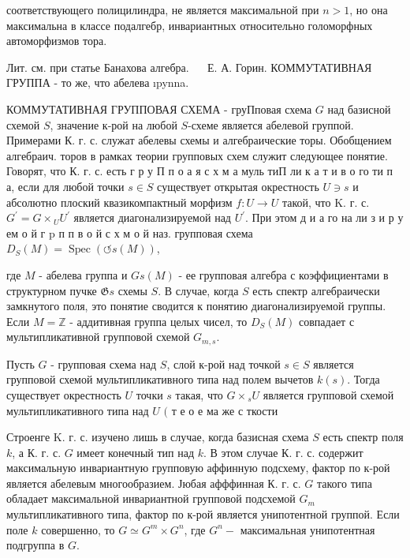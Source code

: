 \documentclass[10pt]{article}
\begin{document}
соответствующего полицилиндра, не является максимальной при $n>1$, но она максимальна в классе подалгебр, инвариантных относительно голоморфных автоморфизмов тора.



Лит. см. при статье Банахова алгебра. $\quad$ Е. А. Горин. КОММУТАТИВНАЯ ГРУППА - то же, что абелева ıpynna.



КОММУТАТИВНАЯ ГРУППОВАЯ СХЕМА - груПповая схема $G$ над базисной схемой $S$, значение к-рой на любой $S$-схеме является абелевой группой. Примерами К. г. с. служат абелевы схемы и алгебраические торы. Обобщением алгебраич. торов в рамках теории групповых схем служит следующее понятие. Говорят, что К. г. с. есть г р у П п о а я с х м а муль тиП ли к а т и в о го ти п а, если для любой точки $s \in S$ существует открытая окрестность $U \ni s$ и абсолютно плоский квазикомпактный морфизм $f: U \rightarrow U$ такой, что K. г. с. $G^{\prime}=G \times{ }_{U} U^{\prime}$ является диагонализируемой над $U^{\prime}$. При этом д и а го на ли з и р у ем о й г $\mathrm{p}$ п п в о й с х м о й наз. групповая схема $D_{S}(M)=\operatorname{Spec}(\circlearrowleft s(M))$,



где $M$ - абелева группа и $G s(M)$ - ее групповая алгебра с коэффициентами в структурном пучке $\mathfrak{G} s$ схемы $S$. В случае, когда $S$ есть спектр алгебраически замкнутого поля, это понятие сводится к понятию диагонализируемой группы. Если $M=\mathbb{Z}$ - аддитивная группа целых чисел, то $D_{S}(M)$ совпадает с мультипликативной групповой схемой $G_{m, s}$.



Пусть $G$ - групповая схема над $S$, слой к-рой над точкой $s \in S$ является групповой схемой мультипликативного типа над полем вычетов $k(s)$. Тогда существует окрестность $U$ точки $s$ такая, что $G \times{ }_{s} U$ является групповой схемой мультипликативного типа над $U$ $($ т е о е ма же с ткости



Строенге K. г. с. изучено лишь в случае, когда базисная схема $S$ есть спектр поля $k$, а К. г. с. $G$ имеет конечный тип над $k$. В этом случае К. г. с. содержит максимальную инвариантную групповую аффинную подсхему, фактор по к-рой является абелевым многообразием. Јюбая афффинная К. г. с. $G$ такого типа обладает максимальной инвариантной групповой подсхемой $G_{m}$ мультипликативного типа, фактор по к-рой является унипотентной группой. Если поле $k$ совершенно, то $G \simeq G^{m} \times G^{n}$, где $G^{n}-$ максимальная унипотентная подгруппа в $G$.
\end{document}
